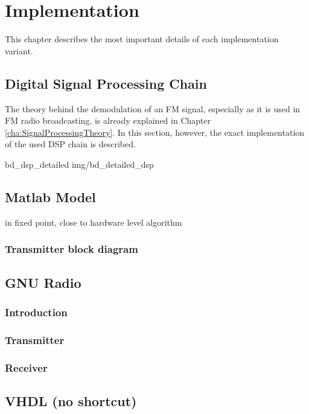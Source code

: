 \chapter{Implementation}
\label{cha:Implementation}

This chapter describes the most important details of each implementation variant.

\section{Digital Signal Processing Chain}

The theory behind the demodulation of an FM signal, especially as it is used in FM radio broadcasting, is already explained in Chapter \ref{cha:SignalProcessingTheory}. In this section, however, the exact implementation of the used DSP chain is described.


 {bd_dsp_detailed} {img/bd_detailed_dsp}

\section{Matlab Model}

in fixed point, close to hardware level algorithm

\subsection{Transmitter block diagram}

\section{GNU Radio}
  \subsection{Introduction}
  \subsection{Transmitter}
  \subsection{Receiver}

\section{VHDL (no shortcut)}
